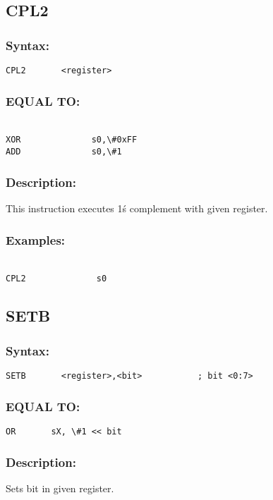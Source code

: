 {    \subsection{CPL2}
        \subsubsection{Syntax:}
            \verb'CPL2       <register>'

        \subsubsection{EQUAL TO:}
        {
            ~\\
            \usecodefont
            \verb'XOR              s0,\#0xFF'\\
            \verb'ADD              s0,\#1'\\
        }
        \subsubsection{Description:}
            This instruction executes 1\'s complement with given register.

        \subsubsection{Examples:}
        {
            ~\\
            \usecodefont
            \verb'CPL2              s0'\\
        }

    \subsection{SETB}
        \subsubsection{Syntax:}
            \verb'SETB       <register>,<bit>           ; bit <0:7>'

        \subsubsection{EQUAL TO:}
            \verb'OR       sX, \#1 << bit'

        \subsubsection{Description:}
            Sets bit in given register.

}
